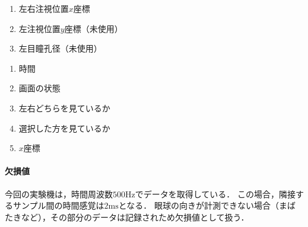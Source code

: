 \begin{center}
\begin{framed}
\begin{minipage}[t]{.48\textwidth}
\begin{enumerate}
\begin{itemize}
                      \end{itemize}
                \item 左右注視位置\(x\)座標
                \item 左注視位置\(y\)座標（未使用）
                \item 左目瞳孔径（未使用）
            \end{enumerate}
        \end{minipage}
        \begin{minipage}[t]{.26\textwidth}
            \begin{center}
                \expos
            \end{center}
            \begin{enumerate}
                \renewcommand{\labelenumi}{\theenumi 列目}
                \item 時間
                \item 画面の状態
                \item {\footnotesize 左右どちらを見ているか}
                \item {\footnotesize 選択した方を見ているか}
                \item \(x\)座標
            \end{enumerate}
        \end{minipage}
    \end{framed}
\end{center}
\paragraph{欠損値}
今回の実験機\elt は，時間周波数\(500\textrm{Hz}\)でデータを取得している．
この場合，隣接するサンプル間の時間感覚は\(2\textrm{ms}\)となる．
眼球の向きが計測できない場合（まばたきなど），その部分のデータは記録されため欠損値として扱う．
